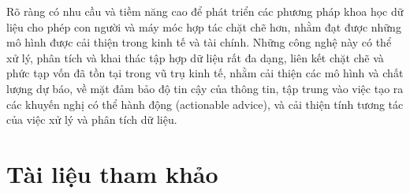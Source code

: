 Rõ ràng có nhu cầu và tiềm năng cao để phát triển các phương pháp khoa học dữ liệu cho phép con người và máy móc hợp tác chặt chẽ hơn, nhằm đạt được những mô hình được cải thiện trong kinh tế và tài chính. Những công nghệ này có thể xử lý, phân tích và khai thác tập hợp dữ liệu rất đa dạng, liên kết chặt chẽ và phức tạp vốn đã tồn tại trong vũ trụ kinh tế, nhằm cải thiện các mô hình và chất lượng dự báo, về mặt đảm bảo độ tin cậy của thông tin, tập trung vào việc tạo ra các khuyến nghị có thể hành động (actionable advice), và cải thiện tính tương tác của việc xử lý và phân tích dữ liệu.

\section*{Tài liệu tham khảo}

